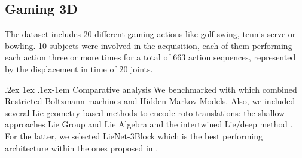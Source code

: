 \documentclass[10pt,twocolumn]{article}
\makeatletter
\renewcommand{\paragraph}{%
	\@startsection{paragraph}{4}%
	{\z@}{.2ex \@plus 1ex \@minus .1ex}{-1em}%
	{\normalfont\normalsize\bfseries}%
}
\makeatother
\begin{document}
%
%
%
%

\subsection{Gaming 3D}

The dataset includes 20 different gaming actions like \textsf{golf swing}, \textsf{tennis serve} or \textsf{bowling}. 10 subjects were involved in the acquisition, each of them performing each action three or more times for a total of 663 action sequences, represented by the displacement in time of 20 joints.

\paragraph{Comparative analysis} We benchmarked with \cite{RBMHMM} which combined Restricted Boltzmann machines and Hidden Markov Models. Also, we included several Lie geometry-based methods to encode roto-translations: the shallow approaches Lie Group \cite{Vemulapalli:CVPR14} and Lie Algebra \cite{Vemulapalli:CVPR16} and the intertwined Lie/deep method \cite{deeplie}. For the latter, we selected LieNet-3Block which is the best performing architecture within the ones proposed in \cite{deeplie}.
\end{document}
